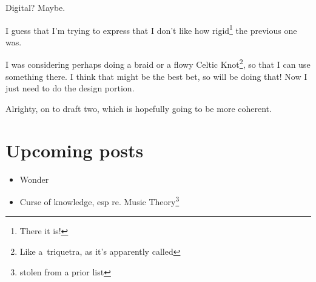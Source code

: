 \documentclass[12pt]{article}
\renewcommand{\,}{\textsuperscript{,}}
\begin{document}
Digital?  
Maybe.

I guess that I'm trying to express that I don't like how rigid\footnote{There it is!} the previous one was.

I was considering perhaps doing a braid or a flowy Celtic Knot\footnote{Like a triquetra, as it's apparently called}, so that I can use something there.  
I think that might be the best bet, so will be doing that!  
Now I just need to do the design portion.

Alrighty, on to draft two, which is hopefully going to be more coherent.

\section{Upcoming posts}  
\begin{itemize}

\item Wonder

\item Curse of knowledge, esp re. Music Theory\footnote{stolen from a prior list}

\end{itemize}
\end{document}
